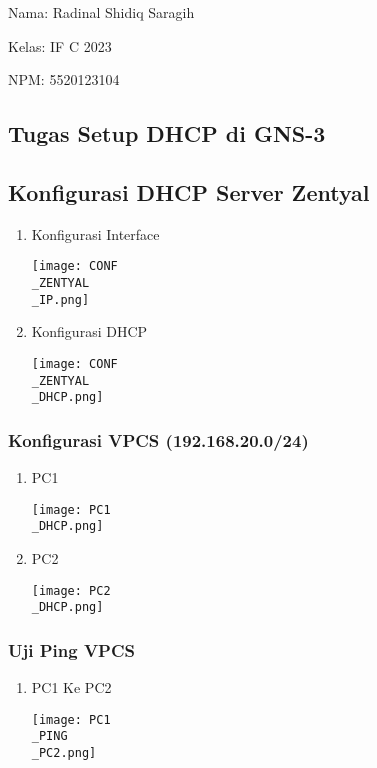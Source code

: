 \documentclass[12pt, a4paper]{article}
\date{}
\begin{document}
Nama: Radinal Shidiq Saragih

Kelas: IF C 2023

NPM: 5520123104

\begin{center}
  \section*{Tugas Setup DHCP di GNS-3}
  \vspace{0.5cm}
\end{center}

\subsection*{Konfigurasi DHCP Server Zentyal}

\begin{enumerate}
  \item Konfigurasi Interface

      \texttt{[image: CONF\\\_ZENTYAL\\\_IP.png]}

  \item Konfigurasi DHCP

      \texttt{[image: CONF\\\_ZENTYAL\\\_DHCP.png]}

\end{enumerate}

\newpage

\subsubsection*{Konfigurasi VPCS (192.168.20.0/24)}
\begin{enumerate}
  \item PC1

      \texttt{[image: PC1\\\_DHCP.png]}

  \item PC2

      \texttt{[image: PC2\\\_DHCP.png]}

\end{enumerate}

\subsubsection*{Uji Ping VPCS}
\begin{enumerate}
  \item PC1 Ke PC2

    \texttt{[image: PC1\\\_PING\\\_PC2.png]}

\end{enumerate}
\end{document}

